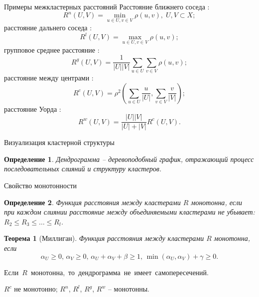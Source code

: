 \documentclass[unicode, notheorems, pdf]{beamer}
\newtheorem{theorem}{Теорема}
\newtheorem{definition}{Определение}
\begin{document}
\begin{frame}{Примеры межкластерных расстояний}
	Расстояние ближнего соседа
	:
	\[R^n(U,V)=\min_{u\in U,v\in V}\rho(u,v),\;U,V\subset X;\]
	расстояние дальнего соседа
	:
	\[R^l(U,V)=\max_{u\in U,v\in V}\rho(u,v);\]
	групповое среднее расстояние
	:
	\[R^g(U,V)=\frac{1}{|U||V|}\sum_{u\in U}\sum_{v\in V}\rho(u,v);\]
	расстояние между центрами
	:
	\[R^c(U,V)=\rho^2\left(\sum_{u\in U}\frac{u}{|U|},\sum_{v\in V}\frac{v}{|V|}\right);\]
	расстояние Уорда
	:
	\[R^w(U,V)=\frac{|U||V|}{|U|+|V|}R^c(U,V).\]
\end{frame}

\begin{frame}{Визуализация кластерной структуры}
	\begin{definition}
		Дендрограмма -- деревоподобный график, отражающий процесс последовательных слияний и структуру кластеров.
	\end{definition}
	\begin{figure}
	\end{figure}
\end{frame}

\begin{frame}{Свойство монотонности}
	\begin{definition}
		Функция расстояния между кластерами $R$ {\it монотонна}, если при каждом слиянии расстояние между объединяемыми кластерами не убывает: $R_2\le R_3\le\dots\le R_l$.
	\end{definition}
	\begin{theorem}[Миллиган]
		Функция расстояния между кластерами $R$ монотонна, если 
		\[\alpha_U\ge0,\,\alpha_V\ge0,\,\alpha_U+\alpha_V+\beta\ge1,\,\min(\alpha_U,\alpha_V)+\gamma\ge0.\]
	\end{theorem}
	\mbox{Если $R$ монотонна, то дендрограмма не имеет самопересечений.}

	\vspace{.5cm}
	$R^c$ не монотонно; $R^n$, $R^l$, $R^g$, $R^w$ -- монотонны.
\end{frame}
\end{document}

